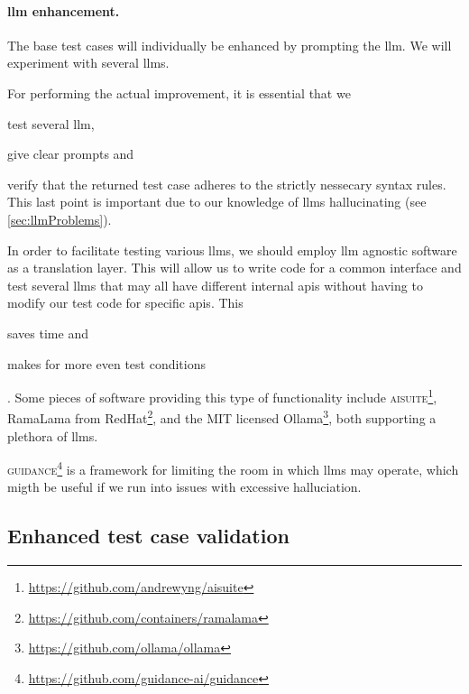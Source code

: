 \paragraph{\acrshort{llm} enhancement.} The base test cases will
individually be enhanced by prompting the \acrshort{llm}. We will experiment with several
\acrshort{llms}.

For performing the actual improvement, it is essential that we \begin{inparaenum}
    \item test several \acrshort{llm},
    \item give clear prompts
    and
    \item verify that the returned test case adheres to the strictly nessecary
    syntax rules. This last point is important due to our knowledge of
    \acrshort{llms} hallucinating (see \cref{sec:llmProblems}).
\end{inparaenum}

In order to facilitate testing various \acrlong{llms}, we should employ
\acrshort{llm} agnostic software as a translation layer. This will allow us to
write code for a common interface and test several \acrshort{llms} that may all
have different internal \acrfull{apis} without having to modify our test code
for specific \acrshort{apis}. This \begin{inparaenum}
    \item saves time
    and
    \item makes for more even test conditions \end{inparaenum}. Some pieces of software providing
this type of functionality include
\textsc{aisuite}\footnote{\url{https://github.com/andrewyng/aisuite}}, RamaLama from
RedHat\footnote{\url{https://github.com/containers/ramalama}}, and the MIT licensed
Ollama\footnote{\url{https://github.com/ollama/ollama}}, both supporting a plethora of
\acrlong{llms}.

\textsc{guidance}\footnote{\url{https://github.com/guidance-ai/guidance}} is a
framework for limiting the room in which \acrshort{llms} may operate, which
migth be useful if we run into issues with excessive halluciation.


\subsection{Enhanced test case validation}

